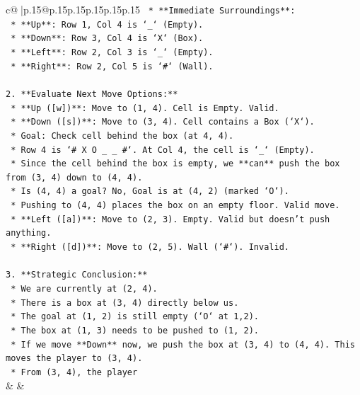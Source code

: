 \documentclass{article}
\begin{document}
{\begin{supertabular}{c@{$\;$}|p{.15\linewidth}@{}p{.15\linewidth}p{.15\linewidth}p{.15\linewidth}p{.15\linewidth}p{.15\linewidth}}
{{{\texttt{    *   **Immediate Surroundings**:} \\
\texttt{        *   **Up**: Row 1, Col 4 is `\_` (Empty).} \\
\texttt{        *   **Down**: Row 3, Col 4 is `X` (Box).} \\
\texttt{        *   **Left**: Row 2, Col 3 is `\_` (Empty).} \\
\texttt{        *   **Right**: Row 2, Col 5 is `\#` (Wall).} \\
\\ 
\texttt{2.  **Evaluate Next Move Options:**} \\
\texttt{    *   **Up ({[}w{]})**: Move to (1, 4). Cell is Empty. Valid.} \\
\texttt{    *   **Down ({[}s{]})**: Move to (3, 4). Cell contains a Box (`X`).} \\
\texttt{        *   Goal: Check cell behind the box (at 4, 4).} \\
\texttt{        *   Row 4 is `\# X O \_ \_ \#`. At Col 4, the cell is `\_` (Empty).} \\
\texttt{        *   Since the cell behind the box is empty, we **can** push the box from (3, 4) down to (4, 4).} \\
\texttt{        *   Is (4, 4) a goal? No, Goal is at (4, 2) (marked `O`).} \\
\texttt{        *   Pushing to (4, 4) places the box on an empty floor. Valid move.} \\
\texttt{    *   **Left ({[}a{]})**: Move to (2, 3). Empty. Valid but doesn't push anything.} \\
\texttt{    *   **Right ({[}d{]})**: Move to (2, 5). Wall (`\#`). Invalid.} \\
\\ 
\texttt{3.  **Strategic Conclusion:**} \\
\texttt{    *   We are currently at (2, 4).} \\
\texttt{    *   There is a box at (3, 4) directly below us.} \\
\texttt{    *   The goal at (1, 2) is still empty (`O` at 1,2).} \\
\texttt{    *   The box at (1, 3) needs to be pushed to (1, 2).} \\
\texttt{    *   If we move **Down** now, we push the box at (3, 4) to (4, 4). This moves the player to (3, 4).} \\
\texttt{    *   From (3, 4), the player} \\
            }
        }
    }
    & & \\ \\


\end{supertabular}}
\end{document}
